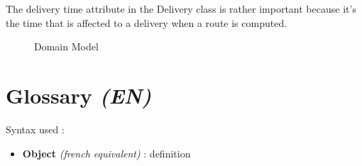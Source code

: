 \documentclass[paper=a4,fontsize=11pt]{report}
\numberwithin{equation}{section}		%
\numberwithin{figure}{section}		%
\numberwithin{table}{section}		%
\renewcommand{\bf}[1]{\textbf{#1}}
\renewcommand{\it}[1]{\textit{#1}}
\begin{document}
The delivery time attribute in the Delivery class is rather important because it's the time that is affected to a delivery when a route is computed.

\begin{figure}[H]
\centering
\noindent{}
\caption{Domain Model}
\end{figure}

\section{Glossary \it{(EN)}}
\label{sec:glossary}

Syntax used :
\begin{itemize}
	\item[\textbullet] \bf{Object} \it{(french equivalent)} : definition \\
\end{itemize}
\end{document}
